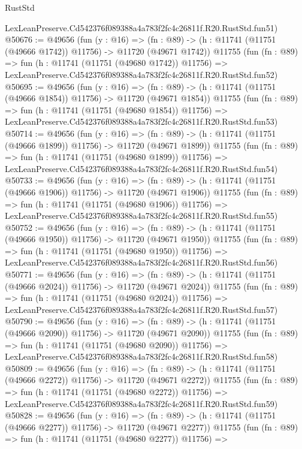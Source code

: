 \begin{lexlean}{RustStd}
\begin{coremodule}
    LexLeanPreserve.Cd542376f089388a4a783f2fc4c26811f.R20.RustStd.fun51)
@50676 := @49656
    (fun (y : @16) =>
    (fn : @89) -> (h : @11741 (@11751 (@49666 @1742)) @11756) -> @11720 (@49671 @1742))
    @11755
    (fun (fn : @89) =>
    fun (h : @11741 (@11751 (@49680 @1742)) @11756) =>
    LexLeanPreserve.Cd542376f089388a4a783f2fc4c26811f.R20.RustStd.fun52)
@50695 := @49656
    (fun (y : @16) =>
    (fn : @89) -> (h : @11741 (@11751 (@49666 @1854)) @11756) -> @11720 (@49671 @1854))
    @11755
    (fun (fn : @89) =>
    fun (h : @11741 (@11751 (@49680 @1854)) @11756) =>
    LexLeanPreserve.Cd542376f089388a4a783f2fc4c26811f.R20.RustStd.fun53)
@50714 := @49656
    (fun (y : @16) =>
    (fn : @89) -> (h : @11741 (@11751 (@49666 @1899)) @11756) -> @11720 (@49671 @1899))
    @11755
    (fun (fn : @89) =>
    fun (h : @11741 (@11751 (@49680 @1899)) @11756) =>
    LexLeanPreserve.Cd542376f089388a4a783f2fc4c26811f.R20.RustStd.fun54)
@50733 := @49656
    (fun (y : @16) =>
    (fn : @89) -> (h : @11741 (@11751 (@49666 @1906)) @11756) -> @11720 (@49671 @1906))
    @11755
    (fun (fn : @89) =>
    fun (h : @11741 (@11751 (@49680 @1906)) @11756) =>
    LexLeanPreserve.Cd542376f089388a4a783f2fc4c26811f.R20.RustStd.fun55)
@50752 := @49656
    (fun (y : @16) =>
    (fn : @89) -> (h : @11741 (@11751 (@49666 @1950)) @11756) -> @11720 (@49671 @1950))
    @11755
    (fun (fn : @89) =>
    fun (h : @11741 (@11751 (@49680 @1950)) @11756) =>
    LexLeanPreserve.Cd542376f089388a4a783f2fc4c26811f.R20.RustStd.fun56)
@50771 := @49656
    (fun (y : @16) =>
    (fn : @89) -> (h : @11741 (@11751 (@49666 @2024)) @11756) -> @11720 (@49671 @2024))
    @11755
    (fun (fn : @89) =>
    fun (h : @11741 (@11751 (@49680 @2024)) @11756) =>
    LexLeanPreserve.Cd542376f089388a4a783f2fc4c26811f.R20.RustStd.fun57)
@50790 := @49656
    (fun (y : @16) =>
    (fn : @89) -> (h : @11741 (@11751 (@49666 @2090)) @11756) -> @11720 (@49671 @2090))
    @11755
    (fun (fn : @89) =>
    fun (h : @11741 (@11751 (@49680 @2090)) @11756) =>
    LexLeanPreserve.Cd542376f089388a4a783f2fc4c26811f.R20.RustStd.fun58)
@50809 := @49656
    (fun (y : @16) =>
    (fn : @89) -> (h : @11741 (@11751 (@49666 @2272)) @11756) -> @11720 (@49671 @2272))
    @11755
    (fun (fn : @89) =>
    fun (h : @11741 (@11751 (@49680 @2272)) @11756) =>
    LexLeanPreserve.Cd542376f089388a4a783f2fc4c26811f.R20.RustStd.fun59)
@50828 := @49656
    (fun (y : @16) =>
    (fn : @89) -> (h : @11741 (@11751 (@49666 @2277)) @11756) -> @11720 (@49671 @2277))
    @11755
    (fun (fn : @89) =>
    fun (h : @11741 (@11751 (@49680 @2277)) @11756) =>

\end{coremodule}
\end{lexlean}
